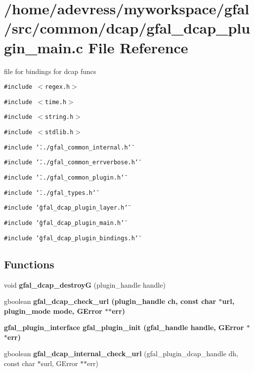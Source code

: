 \section{/home/adevress/myworkspace/gfal/src/common/dcap/gfal\_\-dcap\_\-plugin\_\-main.c File Reference}
\label{gfal__dcap__plugin__main_8c}
file for bindings for dcap funcs 

{\tt \#include $<$regex.h$>$}\par
{\tt \#include $<$time.h$>$}\par
{\tt \#include $<$string.h$>$}\par
{\tt \#include $<$stdlib.h$>$}\par
{\tt \#include \char`\"{}../gfal\_\-common\_\-internal.h\char`\"{}}\par
{\tt \#include \char`\"{}../gfal\_\-common\_\-errverbose.h\char`\"{}}\par
{\tt \#include \char`\"{}../gfal\_\-common\_\-plugin.h\char`\"{}}\par
{\tt \#include \char`\"{}../gfal\_\-types.h\char`\"{}}\par
{\tt \#include \char`\"{}gfal\_\-dcap\_\-plugin\_\-layer.h\char`\"{}}\par
{\tt \#include \char`\"{}gfal\_\-dcap\_\-plugin\_\-main.h\char`\"{}}\par
{\tt \#include \char`\"{}gfal\_\-dcap\_\-plugin\_\-bindings.h\char`\"{}}\par
\subsection*{Functions}
\begin{CompactItemize}
\item 
void \textbf{gfal\_\-dcap\_\-destroy\-G} (plugin\_\-handle handle)\label{gfal__dcap__plugin__main_8c_8cd0c4266c418c68d4a8b282cca7325c}

\item 
gboolean \bf{gfal\_\-dcap\_\-check\_\-url} (plugin\_\-handle ch, const char $\ast$url, plugin\_\-mode mode, GError $\ast$$\ast$err)
\item 
\bf{gfal\_\-plugin\_\-interface} \bf{gfal\_\-plugin\_\-init} (gfal\_\-handle handle, GError $\ast$$\ast$err)
\item 
gboolean \textbf{gfal\_\-dcap\_\-internal\_\-check\_\-url} (gfal\_\-plugin\_\-dcap\_\-handle dh, const char $\ast$surl, GError $\ast$$\ast$err)\label{gfal__dcap__plugin__main_8c_73fbacad3f9f3025a24c39f4d1dfad2d}

\end{CompactItemize}


